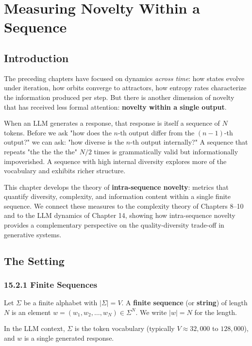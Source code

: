 \chapter{Measuring Novelty Within a Sequence}

\section{Introduction}

The preceding chapters have focused on dynamics \textit{across time}: how states evolve under iteration, how orbits converge to attractors, how entropy rates characterize the information produced per step. But there is another dimension of novelty that has received less formal attention: \textbf{novelty within a single output}.

When an LLM generates a response, that response is itself a sequence of $N$ tokens. Before we ask "how does the $n$-th output differ from the $(n-1)$-th output?" we can ask: "how diverse is the $n$-th output internally?" A sequence that repeats "the the the the" $N/2$ times is grammatically valid but informationally impoverished. A sequence with high internal diversity explores more of the vocabulary and exhibits richer structure.

This chapter develops the theory of \textbf{intra-sequence novelty}: metrics that quantify diversity, complexity, and information content within a single finite sequence. We connect these measures to the complexity theory of Chapters 8--10 and to the LLM dynamics of Chapter 14, showing how intra-sequence novelty provides a complementary perspective on the quality-diversity trade-off in generative systems.



\section{The Setting}

\subsection{15.2.1 Finite Sequences}

Let $\Sigma$ be a finite alphabet with $|\Sigma| = V$. A \textbf{finite sequence} (or \textbf{string}) of length $N$ is an element $w = (w_1, w_2, \ldots, w_N) \in \Sigma^N$. We write $|w| = N$ for the length.

In the LLM context, $\Sigma$ is the token vocabulary (typically $V \approx 32{,}000$ to $128{,}000$), and $w$ is a single generated response.

